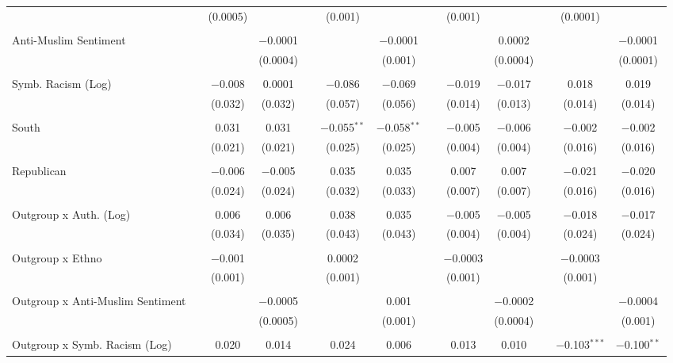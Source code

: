 \begin{table}[H]
{\begin{tabular}{@{\extracolsep{5pt}}lcccccccccccc}
  &  & (0.0005) &  &  & (0.001) &  &  & (0.001) &  &  & (0.0001) &  \\ 
  & & & & & & & & & & & & \\ 
 Anti-Muslim Sentiment &  &  & $-$0.0001 &  &  & $-$0.0001 &  &  & 0.0002 &  &  & $-$0.0001 \\ 
  &  &  & (0.0004) &  &  & (0.001) &  &  & (0.0004) &  &  & (0.0001) \\ 
  & & & & & & & & & & & & \\ 
 Symb. Racism (Log) &  & $-$0.008 & 0.0001 &  & $-$0.086 & $-$0.069 &  & $-$0.019 & $-$0.017 &  & 0.018 & 0.019 \\ 
  &  & (0.032) & (0.032) &  & (0.057) & (0.056) &  & (0.014) & (0.013) &  & (0.014) & (0.014) \\ 
  & & & & & & & & & & & & \\ 
 South &  & 0.031 & 0.031 &  & $-$0.055$^{**}$ & $-$0.058$^{**}$ &  & $-$0.005 & $-$0.006 &  & $-$0.002 & $-$0.002 \\ 
  &  & (0.021) & (0.021) &  & (0.025) & (0.025) &  & (0.004) & (0.004) &  & (0.016) & (0.016) \\ 
  & & & & & & & & & & & & \\ 
 Republican &  & $-$0.006 & $-$0.005 &  & 0.035 & 0.035 &  & 0.007 & 0.007 &  & $-$0.021 & $-$0.020 \\ 
  &  & (0.024) & (0.024) &  & (0.032) & (0.033) &  & (0.007) & (0.007) &  & (0.016) & (0.016) \\ 
  & & & & & & & & & & & & \\ 
 Outgroup x Auth. (Log) &  & 0.006 & 0.006 &  & 0.038 & 0.035 &  & $-$0.005 & $-$0.005 &  & $-$0.018 & $-$0.017 \\ 
  &  & (0.034) & (0.035) &  & (0.043) & (0.043) &  & (0.004) & (0.004) &  & (0.024) & (0.024) \\ 
  & & & & & & & & & & & & \\ 
 Outgroup x Ethno &  & $-$0.001 &  &  & 0.0002 &  &  & $-$0.0003 &  &  & $-$0.0003 &  \\ 
  &  & (0.001) &  &  & (0.001) &  &  & (0.001) &  &  & (0.001) &  \\ 
  & & & & & & & & & & & & \\ 
 Outgroup x Anti-Muslim Sentiment &  &  & $-$0.0005 &  &  & 0.001 &  &  & $-$0.0002 &  &  & $-$0.0004 \\ 
  &  &  & (0.0005) &  &  & (0.001) &  &  & (0.0004) &  &  & (0.001) \\ 
  & & & & & & & & & & & & \\ 
 Outgroup x Symb. Racism (Log) &  & 0.020 & 0.014 &  & 0.024 & 0.006 &  & 0.013 & 0.010 &  & $-$0.103$^{***}$ & $-$0.100$^{**}$ \\ 

\end{tabular}}
\end{table}
